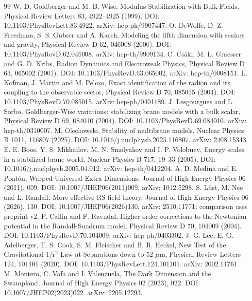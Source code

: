 \documentclass[11pt]{article}
\begin{document}
\begin{thebibliography}{99}
 W. D. Goldberger and M. B. Wise, Modulus Stabilization with Bulk Fields, Physical Review Letters 83, 4922--4925 (1999). DOI: 10.1103/PhysRevLett.83.4922. arXiv: hep-ph/9907447.
 O. DeWolfe, D. Z. Freedman, S. S. Gubser and A. Karch, Modeling the fifth dimension with scalars and gravity, Physical Review D 62, 046008 (2000). DOI: 10.1103/PhysRevD.62.046008. arXiv: hep-th/9909134.
 C. Csáki, M. L. Graesser and G. D. Kribs, Radion Dynamics and Electroweak Physics, Physical Review D 63, 065002 (2001). DOI: 10.1103/PhysRevD.63.065002. arXiv: hep-th/0008151.
 L. Kofman, J. Martin and M. Peloso, Exact identification of the radion and its coupling to the observable sector, Physical Review D 70, 085015 (2004). DOI: 10.1103/PhysRevD.70.085015. arXiv: hep-ph/0401189.
 J. Lesgourgues and L. Sorbo, Goldberger-Wise variations: stabilizing brane models with a bulk scalar, Physical Review D 69, 084010 (2004). DOI: 10.1103/PhysRevD.69.084010. arXiv: hep-th/0310007.
 M. Olechowski, Stability of multibrane models, Nuclear Physics B 1011, 116807 (2025). DOI: 10.1016/j.nuclphysb.2025.116807. arXiv: 2408.15343.
 E. E. Boos, Y. S. Mikhailov, M. N. Smolyakov and I. P. Volobuev, Energy scales in a stabilized brane world, Nuclear Physics B 717, 19--33 (2005). DOI: 10.1016/j.nuclphysb.2005.04.012. arXiv: hep-th/0412204.
 A. D. Medina and E. Pontón, Warped Universal Extra Dimensions, Journal of High Energy Physics 06 (2011), 009. DOI: 10.1007/JHEP06(2011)009. arXiv: 1012.5298.
 S. Lüst, M. Nee and L. Randall, More effective RS field theory, Journal of High Energy Physics 06 (2026), 130. DOI: 10.1007/JHEP06(2026)130. arXiv: 2510.11771; comparison uses preprint v2.
 P. Callin and F. Ravndal, Higher order corrections to the Newtonian potential in the Randall-Sundrum model, Physical Review D 70, 104009 (2004). DOI: 10.1103/PhysRevD.70.104009. arXiv: hep-ph/0403302.
 J. G. Lee, E. G. Adelberger, T. S. Cook, S. M. Fleischer and B. R. Heckel, New Test of the Gravitational 1/r\({}^2\) Law at Separations down to 52 \(\mu\)m, Physical Review Letters 124, 101101 (2020). DOI: 10.1103/PhysRevLett.124.101101. arXiv: 2002.11761.
 M. Montero, C. Vafa and I. Valenzuela, The Dark Dimension and the Swampland, Journal of High Energy Physics 02 (2023), 022. DOI: 10.1007/JHEP02(2023)022. arXiv: 2205.12293.
\end{thebibliography}
\end{document}
